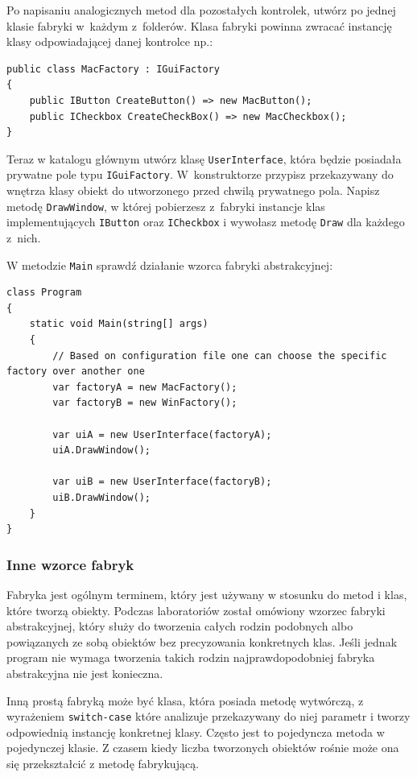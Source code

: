 
Po napisaniu analogicznych metod dla pozostałych kontrolek, utwórz po jednej klasie fabryki w~każdym z~folderów. Klasa fabryki powinna zwracać instancję klasy odpowiadającej danej kontrolce np.:
\begin{lstlisting}
public class MacFactory : IGuiFactory
{
	public IButton CreateButton() => new MacButton();
	public ICheckbox CreateCheckBox() => new MacCheckbox();
}
\end{lstlisting}

Teraz w katalogu głównym utwórz klasę \texttt{UserInterface}, która będzie posiadała prywatne pole typu \texttt{IGuiFactory}. W~konstruktorze przypisz przekazywany do wnętrza klasy obiekt do utworzonego przed chwilą prywatnego pola. Napisz metodę \texttt{DrawWindow}, w której pobierzesz z~fabryki instancje klas implementujących \texttt{IButton} oraz \texttt{ICheckbox} i wywołasz metodę \texttt{Draw} dla każdego z~nich.

W metodzie \texttt{Main} sprawdź działanie wzorca fabryki abstrakcyjnej:
\begin{lstlisting}
class Program
{
	static void Main(string[] args)
	{
		// Based on configuration file one can choose the specific factory over another one
		var factoryA = new MacFactory();
		var factoryB = new WinFactory();
		
		var uiA = new UserInterface(factoryA);
		uiA.DrawWindow();
		
		var uiB = new UserInterface(factoryB);
		uiB.DrawWindow();
	}
}
\end{lstlisting}

\subsubsection{Inne wzorce fabryk}
Fabryka jest ogólnym terminem, który jest używany w stosunku do metod i klas, które tworzą obiekty. Podczas laboratoriów został omówiony wzorzec fabryki abstrakcyjnej, który służy do tworzenia całych rodzin podobnych albo powiązanych ze sobą obiektów bez precyzowania konkretnych klas. Jeśli jednak program nie wymaga tworzenia takich rodzin najprawdopodobniej fabryka abstrakcyjna nie jest konieczna. 

Inną prostą fabryką może być klasa, która posiada metodę wytwórczą, z wyrażeniem \texttt{switch-case} które analizuje przekazywany do niej parametr i tworzy odpowiednią instancję konkretnej klasy. Często jest to pojedyncza metoda w pojedynczej klasie. Z czasem kiedy liczba tworzonych obiektów rośnie może ona się przekształcić z metodę fabrykującą. 


